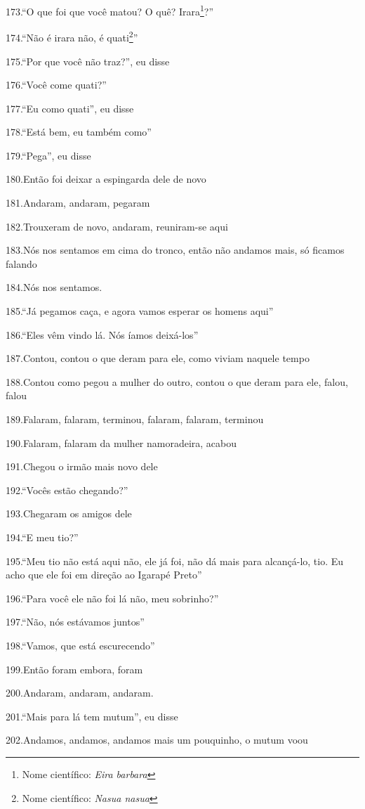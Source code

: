 173.``O que foi que você matou? O quê? Irara\footnote{Nome científico:
  \emph{Eira barbara}}?''

174.``Não é irara não, é quati\footnote{Nome científico: \emph{Nasua
  nasua}}''

175.``Por que você não traz?'', eu disse

176.``Você come quati?''

177.``Eu como quati'', eu disse

178.``Está bem, eu também como''

179.``Pega'', eu disse

180.Então foi deixar a espingarda dele de novo

181.Andaram, andaram, pegaram

182.Trouxeram de novo, andaram, reuniram-se aqui

183.Nós nos sentamos em cima do tronco, então não andamos mais, só
ficamos falando

184.Nós nos sentamos.

185.``Já pegamos caça, e agora vamos esperar os homens aqui''

186.``Eles vêm vindo lá. Nós íamos deixá-los''

187.Contou, contou o que deram para ele, como viviam naquele tempo

188.Contou como pegou a mulher do outro, contou o que deram para ele,
falou, falou

189.Falaram, falaram, terminou, falaram, falaram, terminou

190.Falaram, falaram da mulher namoradeira, acabou

191.Chegou o irmão mais novo dele

192.``Vocês estão chegando?''

193.Chegaram os amigos dele

194.``E meu tio?''

195.``Meu tio não está aqui não, ele já foi, não dá mais para
alcançá-lo, tio. Eu acho que ele foi em direção ao Igarapé Preto''

196.``Para você ele não foi lá não, meu sobrinho?''

197.``Não, nós estávamos juntos''

198.``Vamos, que está escurecendo''

199.Então foram embora, foram

200.Andaram, andaram, andaram.

201.``Mais para lá tem mutum'', eu disse

202.Andamos, andamos, andamos mais um pouquinho, o mutum voou


